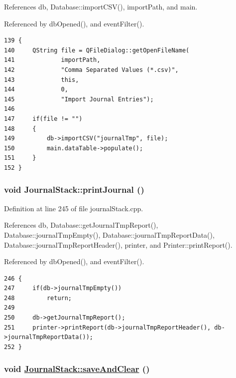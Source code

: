 References db, Database::import\-CSV(), import\-Path, and main.

Referenced by db\-Opened(), and event\-Filter().

\footnotesize\begin{verbatim}139 {
140     QString file = QFileDialog::getOpenFileName(
141             importPath,
142             "Comma Separated Values (*.csv)",
143             this,
144             0,
145             "Import Journal Entries");
146     
147     if(file != "")
148     {
149         db->importCSV("journalTmp", file);
150         main.dataTable->populate();
151     }
152 }
\end{verbatim}\normalsize 


\hypertarget{classJournalStack_k3}{
\subsubsection[printJournal]{\setlength{\rightskip}{0pt plus 5cm}void Journal\-Stack::print\-Journal ()}}
\label{classJournalStack_k3}


Definition at line 245 of file journal\-Stack.cpp.

References db, Database::get\-Journal\-Tmp\-Report(), Database::journal\-Tmp\-Empty(), Database::journal\-Tmp\-Report\-Data(), Database::journal\-Tmp\-Report\-Header(), printer, and Printer::print\-Report().

Referenced by db\-Opened(), and event\-Filter().

\footnotesize\begin{verbatim}246 {
247     if(db->journalTmpEmpty())
248         return;
249 
250     db->getJournalTmpReport();
251     printer->printReport(db->journalTmpReportHeader(), db->journalTmpReportData());
252 }
\end{verbatim}\normalsize 


\hypertarget{classJournalStack_i0}{
\subsubsection[saveAndClear]{\setlength{\rightskip}{0pt plus 5cm}void \hyperlink{classJournalStack_r10}{Journal\-Stack::save\-And\-Clear} ()}}
\label{classJournalStack_i0}




